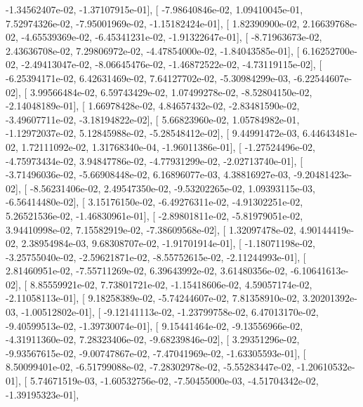 \documentclass{article}
\begin{document}
         -1.34562407e-02,  -1.37107915e-01],
       [ -7.98640846e-02,   1.09410045e-01,   7.52974326e-02,
         -7.95001969e-02,  -1.15182424e-01],
       [  1.82390900e-02,   2.16639768e-02,  -4.65539369e-02,
         -6.45341231e-02,  -1.91322647e-01],
       [ -8.71963673e-02,   2.43636708e-02,   7.29806972e-02,
         -4.47854000e-02,  -1.84043585e-01],
       [  6.16252700e-02,  -2.49413047e-02,  -8.06645476e-02,
         -1.46872522e-02,  -4.73119115e-02],
       [ -6.25394171e-02,   6.42631469e-02,   7.64127702e-02,
         -5.30984299e-03,  -6.22544607e-02],
       [  3.99566484e-02,   6.59743429e-02,   1.07499278e-02,
         -8.52804150e-02,  -2.14048189e-01],
       [  1.66978428e-02,   4.84657432e-02,  -2.83481590e-02,
         -3.49607711e-02,  -3.18194822e-02],
       [  5.66823960e-02,   1.05784982e-01,  -1.12972037e-02,
          5.12845988e-02,  -5.28548412e-02],
       [  9.44991472e-03,   6.44643481e-02,   1.72111092e-02,
          1.31768340e-04,  -1.96011386e-01],
       [ -1.27524496e-02,  -4.75973434e-02,   3.94847786e-02,
         -4.77931299e-02,  -2.02713740e-01],
       [ -3.71496036e-02,  -5.66908448e-02,   6.16896077e-03,
          4.38816927e-03,  -9.20481423e-02],
       [ -8.56231406e-02,   2.49547350e-02,  -9.53202265e-02,
          1.09393115e-03,  -6.56414480e-02],
       [  3.15176150e-02,  -6.49276311e-02,  -4.91302251e-02,
          5.26521536e-02,  -1.46830961e-01],
       [ -2.89801811e-02,  -5.81979051e-02,   3.94410998e-02,
          7.15582919e-02,  -7.38609568e-02],
       [  1.32097478e-02,   4.90144419e-02,   2.38954984e-03,
          9.68308707e-02,  -1.91701914e-01],
       [ -1.18071198e-02,  -3.25755040e-02,  -2.59621871e-02,
         -8.55752615e-02,  -2.11244993e-01],
       [  2.81460951e-02,  -7.55711269e-02,   6.39643992e-02,
          3.61480356e-02,  -6.10641613e-02],
       [  8.85559921e-02,   7.73801721e-02,  -1.15418606e-02,
          4.59057174e-02,  -2.11058113e-01],
       [  9.18258389e-02,  -5.74244607e-02,   7.81358910e-02,
          3.20201392e-03,  -1.00512802e-01],
       [ -9.12141113e-02,  -1.23799758e-02,   6.47013170e-02,
         -9.40599513e-02,  -1.39730074e-01],
       [  9.15441464e-02,  -9.13556966e-02,  -4.31911360e-02,
          7.28323406e-02,  -9.68239846e-02],
       [  3.29351296e-02,  -9.93567615e-02,  -9.00747867e-02,
         -7.47041969e-02,  -1.63305593e-01],
       [  8.50099401e-02,  -6.51799088e-02,  -7.28302978e-02,
         -5.55283447e-02,  -1.20610532e-01],
       [  5.74671519e-03,  -1.60532756e-02,  -7.50455000e-03,
         -4.51704342e-02,  -1.39195323e-01],
\end{document}
